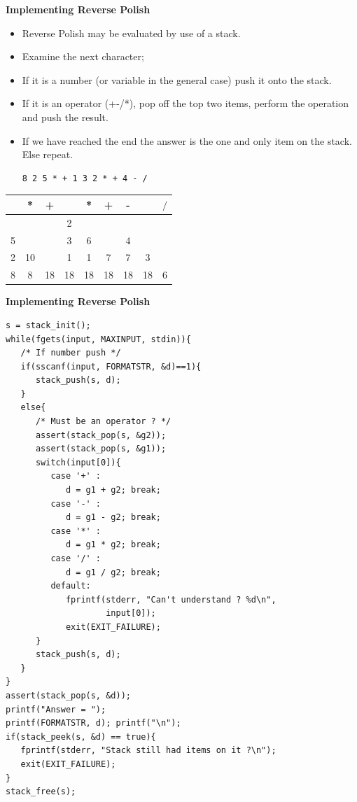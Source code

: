 \newpage
{\samepage
\begin{center}
{\Large{\bf Implementing Reverse Polish}}
\end{center}
\begin{itemize}
\item Reverse Polish may be evaluated by use of a stack.
\item Examine the next character;
\item If it is a number (or variable in the general case)
push it onto the stack.
\item If it is an operator (+-/*), pop off the top two
items, perform the operation and push the result.
\item If we have reached the end the answer is the one and only
item on the stack. Else repeat.
\begin{verbatim}
8 2 5 * + 1 3 2 * + 4 - /
\end{verbatim}
\end{itemize}

\begin{center}
\begin{tabular}{|c|c|c|c|c|c|c|c|c|}\hline
   & * & + &   & * & + & - &   & $/$ \\ \hline
   &   &   & 2 &   &   &   &   &     \\
 5 &   &   & 3 & 6 &   & 4 &   &     \\
 2 & 10&   & 1 & 1 & 7 & 7 & 3 &     \\
 8 & 8 & 18& 18& 18& 18& 18& 18& 6   \\ \hline
\end{tabular}
\end{center}
}

\newpage
{\samepage
\begin{center}
{\Large{\bf Implementing Reverse Polish}}
\end{center}
{\small
\begin{verbatim}
s = stack_init();
while(fgets(input, MAXINPUT, stdin)){
   /* If number push */
   if(sscanf(input, FORMATSTR, &d)==1){
      stack_push(s, d);
   }
   else{
      /* Must be an operator ? */
      assert(stack_pop(s, &g2));
      assert(stack_pop(s, &g1));
      switch(input[0]){
         case '+' :
            d = g1 + g2; break;
         case '-' :
            d = g1 - g2; break;
         case '*' :
            d = g1 * g2; break;
         case '/' :
            d = g1 / g2; break;
         default:
            fprintf(stderr, "Can't understand ? %d\n",
                    input[0]);
            exit(EXIT_FAILURE);
      }
      stack_push(s, d);
   }
}
assert(stack_pop(s, &d));
printf("Answer = ");
printf(FORMATSTR, d); printf("\n");
if(stack_peek(s, &d) == true){
   fprintf(stderr, "Stack still had items on it ?\n");
   exit(EXIT_FAILURE);
}
stack_free(s);
\end{verbatim}
}}

